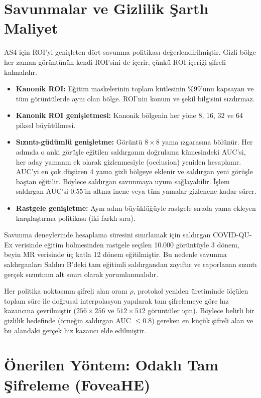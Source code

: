 \section{Savunmalar ve Gizlilik Şartlı Maliyet}\label{sec:defense}

AS4 için ROI'yi genişleten dört savunma politikası değerlendirilmiştir. Gizli bölge her zaman görüntünün kendi ROI'sini de içerir, çünkü ROI içeriği şifreli kalmalıdır.

\begin{itemize}
\item \textbf{Kanonik ROI:} Eğitim maskelerinin toplam kütlesinin \%99'unu kapsayan ve tüm görüntülerde aynı olan bölge. ROI'nin konum ve şekil bilgisini sızdırmaz.
\item \textbf{Kanonik ROI genişletmesi:} Kanonik bölgenin her yöne $8$, $16$, $32$ ve $64$ piksel büyütülmesi.
\item \textbf{Sızıntı-güdümlü genişletme:} Görüntü $8 \times 8$ yama ızgarasına bölünür. Her adımda o anki görüşle eğitilen saldırganın doğrulama kümesindeki AUC'si, her aday yamanın ek olarak gizlenmesiyle (occlusion) yeniden hesaplanır. AUC'yi en çok düşüren 4 yama gizli bölgeye eklenir ve saldırgan yeni görüşle baştan eğitilir. Böylece saldırgan savunmaya uyum sağlayabilir. İşlem saldırgan AUC'si $0.55$'in altına inene veya tüm yamalar gizlenene kadar sürer.
\item \textbf{Rastgele genişletme:} Aynı adım büyüklüğüyle rastgele sırada yama ekleyen karşılaştırma politikası (iki farklı sıra).
\end{itemize}

Savunma deneylerinde hesaplama süresini sınırlamak için saldırgan COVID-QU-Ex verisinde eğitim bölmesinden rastgele seçilen 10.000 görüntüyle 3 dönem, beyin MR verisinde üç katla 12 dönem eğitilmiştir. Bu nedenle savunma saldırganları Saldırı B'deki tam eğitimli saldırgandan zayıftır ve raporlanan sızıntı gerçek sızıntının alt sınırı olarak yorumlanmalıdır.

Her politika noktasının şifreli alan oranı $\rho$, protokol yeniden üretiminde ölçülen toplam süre ile doğrusal interpolasyon yapılarak tam şifrelemeye göre hız kazancına çevrilmiştir ($256 \times 256$ ve $512 \times 512$ görüntüler için). Böylece belirli bir gizlilik hedefinde (örneğin saldırgan AUC $\leq 0.8$) gereken en küçük şifreli alan ve bu alandaki gerçek hız kazancı elde edilmiştir.

\section{Önerilen Yöntem: Odaklı Tam Şifreleme (FoveaHE)}\label{sec:foveahe}

